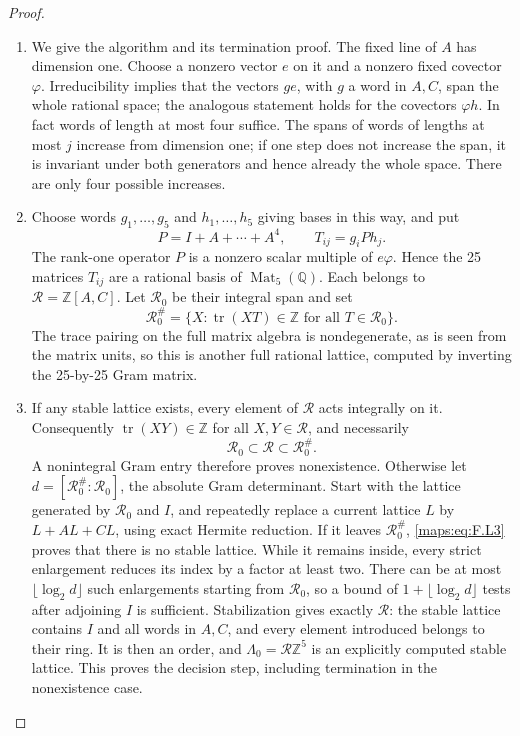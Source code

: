 \begin{proof}
\begin{enumerate}[label=\arabic*.]
\item We give the algorithm and its termination proof.
The fixed line of $A$ has dimension one.  Choose a nonzero
vector $e$ on it and a nonzero fixed covector $\varphi$.
Irreducibility implies that the vectors $ge$, with $g$ a
word in $A,C$, span the whole rational space; the analogous
statement holds for the covectors $\varphi h$.
In fact words of length at most four suffice.  The spans of
words of lengths at most $j$ increase from dimension one;
if one step does not increase the span, it is invariant
under both generators and hence already the whole space.
There are only four possible increases.

\item Choose words $g_1,\ldots,g_5$ and $h_1,\ldots,h_5$ giving
bases in this way, and put
\[
 P=I+A+\cdots+A^4,\qquad T_{ij}=g_iPh_j.
 \tag{F.L1}\label{maps:eq:F.L1}
\]
The rank-one operator $P$ is a nonzero scalar multiple of
$e\varphi$.  Hence the 25 matrices $T_{ij}$ are a rational
basis of $\operatorname{Mat}_5(\mathbb Q)$.
Each belongs to $\mathcal R=\mathbb Z[A,C]$.
Let $\mathcal R_0$ be their integral span and set
\[
 \mathcal R_0^\#=
 \{X:\operatorname{tr}(XT)\in\mathbb Z
                     \text{ for all }T\in\mathcal R_0\}.
 \tag{F.L2}\label{maps:eq:F.L2}
\]
The trace pairing on the full matrix algebra is
nondegenerate, as is seen from the matrix units, so this
is another full rational lattice, computed by inverting
the 25-by-25 Gram matrix.

\item If any stable lattice exists, every element of $\mathcal R$
acts integrally on it.  Consequently
$\operatorname{tr}(XY)\in\mathbb Z$ for all
$X,Y\in\mathcal R$, and necessarily
\[
 \mathcal R_0\subset\mathcal R\subset\mathcal R_0^\#.
 \tag{F.L3}\label{maps:eq:F.L3}
\]
A nonintegral Gram entry therefore proves nonexistence.
Otherwise let
$d=[\mathcal R_0^\#:\mathcal R_0]$, the absolute Gram
determinant.  Start with the lattice generated by
$\mathcal R_0$ and $I$, and repeatedly replace a current
lattice $L$ by $L+AL+CL$, using exact Hermite reduction.
If it leaves $\mathcal R_0^\#$, \eqref{maps:eq:F.L3} proves that there
is no stable lattice.
While it remains inside, every strict enlargement reduces
its index by a factor at least two.
There can be at most $\lfloor\log_2d\rfloor$ such
enlargements starting from $\mathcal R_0$, so a bound of
$1+\lfloor\log_2d\rfloor$ tests after adjoining $I$ is
sufficient.  Stabilization gives exactly $\mathcal R$:
the stable lattice contains $I$ and all words in $A,C$,
and every element introduced belongs to their ring.
It is then an order, and
$\Lambda_0=\mathcal R\mathbb Z^5$ is an explicitly
computed stable lattice.  This proves the decision step,
including termination in the nonexistence case.


\end{enumerate}
\end{proof}
